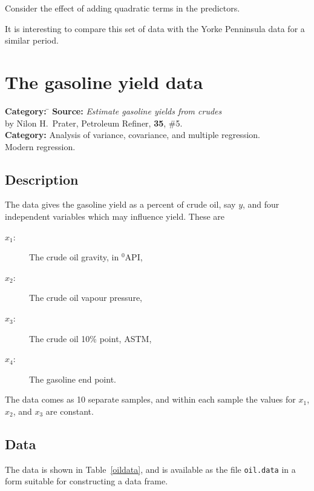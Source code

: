 \documentclass{article}
\newcommand{\code}[1]{\texttt{#1}}
\begin{document}
Consider the effect of adding quadratic terms in the predictors.

It is interesting to compare this set of data with the Yorke Penninsula
data for a similar period.


\clearpage\section{The gasoline yield data}
\begin{tabbing}
\textbf{Category:} \= \kill
\textbf{Source:} \> \textit{Estimate gasoline yields from crudes}\\
\> by Nilon H.~Prater, \textsf{Petroleum Refiner}, \textbf{35}, \#5.\\
\textbf{Category:} \> Analysis of variance, covariance, and multiple regression.\\
\>  Modern regression.
\end{tabbing}

\subsection*{Description}
The data gives the gasoline yield as a percent of crude oil, say $y$, and
four independent variables which may influence yield.  These are
\begin{description}

\item[$x_1$:] The crude oil gravity, in $^0$\textsf{API},

\item[$x_2$:] The crude oil vapour pressure,

\item[$x_3$:] The crude oil 10\% point, \textsf{ASTM},

\item[$x_4$:] The gasoline end point.

\end{description}

The data comes as 10 separate samples, and within each sample the values
for $x_1$, $x_2$, and $x_3$ are constant.

\subsection*{Data}
The data is shown in Table~\ref{oildata}, and is available as the file
\code{oil.data} in a form suitable for constructing a data frame.
\end{document}
